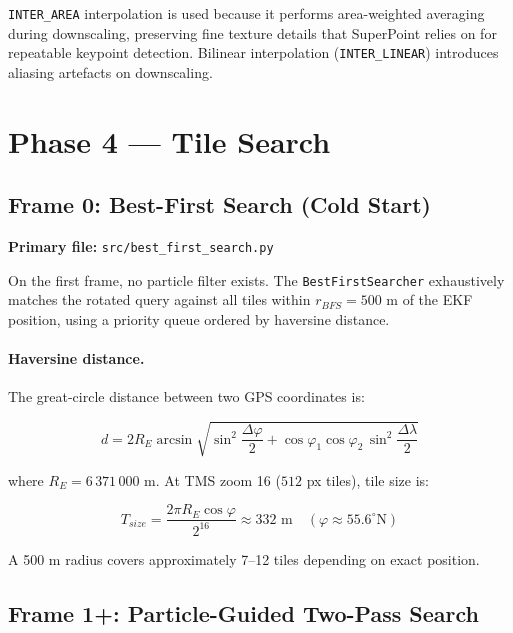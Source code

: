 \documentclass[12pt,a4paper]{article}
\begin{document}
\texttt{INTER\_AREA} interpolation is used because it performs
area-weighted averaging during downscaling, preserving fine texture details
that SuperPoint relies on for repeatable keypoint detection. Bilinear
interpolation (\texttt{INTER\_LINEAR}) introduces aliasing artefacts on
downscaling.

\section{Phase 4 --- Tile Search}

\subsection{Frame 0: Best-First Search (Cold Start)}

\noindent\textbf{Primary file:} \texttt{src/best\_first\_search.py}

On the first frame, no particle filter exists. The
\texttt{BestFirstSearcher} exhaustively matches the rotated query against all
tiles within $r_{BFS} = 500$ m of the EKF position, using a priority queue
ordered by haversine distance.

\paragraph{Haversine distance.}
The great-circle distance between two GPS coordinates is:

\begin{equation}
    d = 2R_E \arcsin\!\sqrt{
        \sin^2\!\frac{\Delta\varphi}{2} +
        \cos\varphi_1\cos\varphi_2\,\sin^2\!\frac{\Delta\lambda}{2}
    }
    \label{eq:haversine}
\end{equation}

where $R_E = 6\,371\,000$ m. At TMS zoom 16 ($512$ px tiles), tile size is:

\begin{equation}
    T_{size} = \frac{2\pi R_E \cos\varphi}{2^{16}}
    \approx 332 \text{ m} \quad (\varphi \approx 55.6^\circ\text{N})
    \label{eq:tile_size}
\end{equation}

A 500 m radius covers approximately 7--12 tiles depending on exact position.

\subsection{Frame 1+: Particle-Guided Two-Pass Search}
\end{document}
